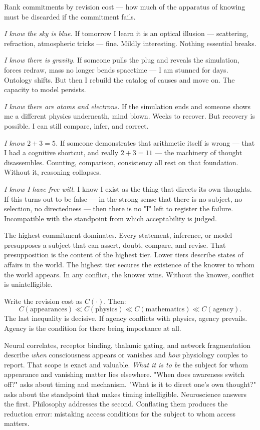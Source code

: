 Rank commitments by revision cost — how much of the apparatus of knowing must be discarded if the commitment fails.

\medskip

\textit{I know the sky is blue.} If tomorrow I learn it is an optical illusion — scattering, refraction, atmospheric tricks — fine. Mildly interesting. Nothing essential breaks.

\textit{I know there is gravity.} If someone pulls the plug and reveals the simulation, forces redraw, mass no longer bends spacetime — I am stunned for days. Ontology shifts. But then I rebuild the catalog of causes and move on. The capacity to model persists.

\textit{I know there are atoms and electrons.} If the simulation ends and someone shows me a different physics underneath, mind blown. Weeks to recover. But recovery is possible. I can still compare, infer, and correct.

\textit{I know $2+3=5$.} If someone demonstrates that arithmetic itself is wrong — that I had a cognitive shortcut, and really $2+3=11$ — the machinery of thought disassembles. Counting, comparison, consistency all rest on that foundation. Without it, reasoning collapses.

\textit{I know I have free will.} I know I exist as the thing that directs its own thoughts. If this turns out to be false — in the strong sense that there is no subject, no selection, no directedness — then there is no "I" left to register the failure. Incompatible with the standpoint from which acceptability is judged.

\medskip

The highest commitment dominates. Every statement, inference, or model presupposes a subject that can assert, doubt, compare, and revise. That presupposition is the content of the highest tier. Lower tiers describe states of affairs in the world. The highest tier secures the existence of the knower to whom the world appears. In any conflict, the knower wins. Without the knower, conflict is unintelligible.

Write the revision cost as $C(\cdot)$. Then:
\[
C(\text{appearances}) \ll C(\text{physics}) \ll C(\text{mathematics}) \ll C(\text{agency}).
\]
The last inequality is decisive. If agency conflicts with physics, agency prevails. Agency is the condition for there being importance at all.

Neural correlates, receptor binding, thalamic gating, and network fragmentation describe \textit{when} consciousness appears or vanishes and \textit{how} physiology couples to report. That scope is exact and valuable. \textit{What it is to be} the subject for whom appearance and vanishing matter lies elsewhere. "When does awareness switch off?" asks about timing and mechanism. "What is it to direct one's own thought?" asks about the standpoint that makes timing intelligible. Neuroscience answers the first. Philosophy addresses the second. Conflating them produces the reduction error: mistaking access conditions for the subject to whom access matters.

